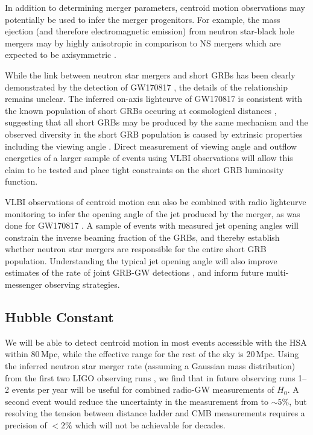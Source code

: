 In addition to determining merger parameters, centroid motion observations may potentially be used to infer the merger progenitors. For example, the mass ejection (and therefore electromagnetic emission) from neutron star-black hole mergers may by highly anisotropic in comparison to NS mergers which are expected to be axisymmetric \citep{2013PhRvD..88d1503K,2014PhRvD..90b4026F,2016PhRvD..94l3016F}.

While the link between neutron star mergers and short GRBs has been clearly demonstrated by the detection of GW170817 \citep{2017ApJ...848L..13A,2017ApJ...848L..14G}, the details of the relationship remains unclear. The inferred on-axis lightcurve of GW170817 is consistent with the known population of short GRBs occuring at cosmological distances \citep{2019ApJ...880L..23W,2019A&A...628A..18S}, suggesting that all short GRBs may be produced by the same mechanism and the observed diversity in the short GRB population is caused by extrinsic properties including the viewing angle \citep{2001ARep...45..236L,2002MNRAS.332..945R,2015ApJ...815..102F,2020A&A...636A.105S}. Direct measurement of viewing angle and outflow energetics of a larger sample of events using VLBI observations will allow this claim to be tested and place tight constraints on the short GRB luminosity function.

VLBI observations of centroid motion can also be combined with radio lightcurve monitoring to infer the opening angle of the jet produced by the merger, as was done for GW170817 \citep{2018Natur.561..355M}. A sample of events with measured jet opening angles will constrain the inverse beaming
fraction of the GRBs, and thereby establish whether neutron star mergers are responsible for the entire short GRB population. Understanding the typical jet opening angle will also improve estimates of the rate of joint GRB-GW detections \citep{2019MNRAS.485.1435H,2019MNRAS.483..840B}, and inform future multi-messenger observing strategies.

\subsection{Hubble Constant}
\label{subsec:H0}
We will be able to detect centroid motion in most events accessible with the HSA within 80\,Mpc, while the effective range for the rest of the sky is 20\,Mpc. Using the inferred neutron star merger rate (assuming a Gaussian mass distribution) from the first two LIGO observing runs \citep[$1090_{-800}^{+1720}$\,Gpc$^{-3}$yr$^{-1}$;][]{2020ApJ...892L...3A}, we find that in future observing runs 1--2 events per year will be useful for combined radio-GW measurements of $H_0$. A second event would reduce the uncertainty in the measurement from \citet{2019NatAs...3..940H} to $\sim 5\%$, but resolving the tension between distance ladder and CMB measurements requires a precision of $<2\%$ which will not be achievable for decades.

